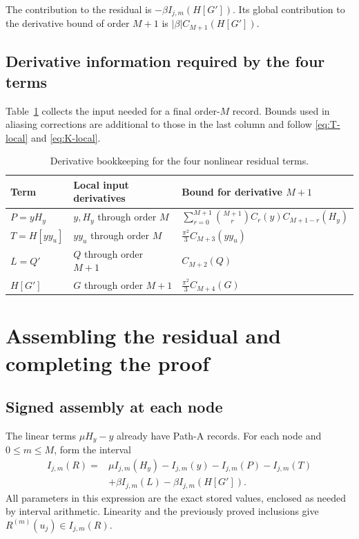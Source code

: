 \documentclass[11pt]{article}
\numberwithin{equation}{section}
\newcommand{\HH}{H_y}
\begin{document}
The contribution to the residual is $-\beta I_{j,m}(H[G'])$. Its global
contribution to the derivative bound of order $M+1$ is $|\beta|C_{M+1}(H[G'])$.

\subsection{Derivative information required by the four terms}

Table~\ref{tab:orders} collects the input needed for a final order-$M$
record. Bounds used in aliasing corrections are additional to those in
the last column and follow \eqref{eq:T-local} and \eqref{eq:K-local}.
\begin{table}[htbp]
\centering
\small
\begin{tabular}{@{}lll@{}}
\toprule
Term & Local input derivatives & Bound for derivative $M+1$\\
\midrule
$P=y\HH$ & $y,\HH$ through order $M$ &
 $\displaystyle\sum_{r=0}^{M+1}\binom{M+1}{r} C_r(y)C_{M+1-r}(\HH)$\\[2ex]
$T=H[yy_u]$ & $yy_u$ through order $M$ &
 $\displaystyle\frac{\pi^2}{3}C_{M+3}(yy_u)$\\[2ex]
$L=Q'$ & $Q$ through order $M+1$ & $C_{M+2}(Q)$\\[1ex]
$H[G']$ & $G$ through order $M+1$ &
 $\displaystyle\frac{\pi^2}{3}C_{M+4}(G)$\\[1ex]
\bottomrule
\end{tabular}
\caption{Derivative bookkeeping for the four nonlinear residual terms.}
\label{tab:orders}
\end{table}

\section{Assembling the residual and completing the proof}
\label{sec:assembly}

\subsection{Signed assembly at each node}

The linear terms $\mu\HH-y$ already have Path-A records. For each node and
$0\leq m\leq M$, form the interval
\begin{equation}
 \begin{split}
 I_{j,m}(R)={}&\mu I_{j,m}(\HH)-I_{j,m}(y)
 -I_{j,m}(P)-I_{j,m}(T)\\
 &+\beta I_{j,m}(L)-\beta I_{j,m}(H[G']).
 \end{split}
 \label{eq:R-local}
\end{equation}
All parameters in this expression are the exact stored values, enclosed
as needed by interval arithmetic. Linearity and the previously proved
inclusions give $R^{(m)}(u_j)\in I_{j,m}(R)$.
\end{document}
